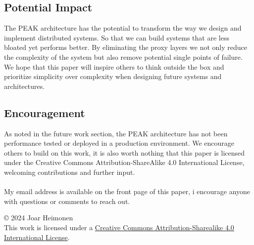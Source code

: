\documentclass[12pt]{article}
\newcommand{\license}{
    \vspace{1em}
    \noindent\small{© 2024 Joar Heimonen\\
    This work is licensed under a \href{https://creativecommons.org/licenses/by-sa/4.0/}{Creative Commons Attribution-Sharealike 4.0 International License}.}
    \vspace{1em}
}
\begin{document}
\subsection{Potential Impact}
The PEAK architecture has the potential to transform the way we design and implement distributed systems.
So that we can build systems that are less bloated yet performs better.
By eliminating the proxy layers we not only reduce the complexity of the system but also
remove potential single points of failure.
We hope that this paper will inspire others to think outside the box 
and prioritize simplicity over complexity when designing future systems
and architectures.

\subsection{Encouragement}
As noted in the future work section, the PEAK architecture has not been performance tested or deployed in a production environment.
We encourage others to build on this work, it is also worth nothing that this paper is 
licensed under the Creative Commons Attribution-ShareAlike 4.0 International License, welcoming contributions and 
further input.
\\
\\
My email address is available on the front page of this paper, i encourage anyone with questions or comments to reach out.

\pagebreak
{}
\printbibliography
\license
\end{document}
